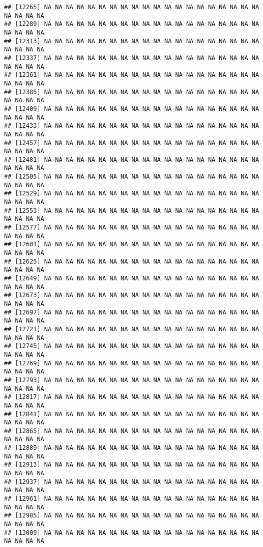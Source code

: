 \documentclass[
]{article}
\begin{document}
\begin{verbatim}
## [12265] NA NA NA NA NA NA NA NA NA NA NA NA NA NA NA NA NA NA NA NA NA NA NA NA
## [12289] NA NA NA NA NA NA NA NA NA NA NA NA NA NA NA NA NA NA NA NA NA NA NA NA
## [12313] NA NA NA NA NA NA NA NA NA NA NA NA NA NA NA NA NA NA NA NA NA NA NA NA
## [12337] NA NA NA NA NA NA NA NA NA NA NA NA NA NA NA NA NA NA NA NA NA NA NA NA
## [12361] NA NA NA NA NA NA NA NA NA NA NA NA NA NA NA NA NA NA NA NA NA NA NA NA
## [12385] NA NA NA NA NA NA NA NA NA NA NA NA NA NA NA NA NA NA NA NA NA NA NA NA
## [12409] NA NA NA NA NA NA NA NA NA NA NA NA NA NA NA NA NA NA NA NA NA NA NA NA
## [12433] NA NA NA NA NA NA NA NA NA NA NA NA NA NA NA NA NA NA NA NA NA NA NA NA
## [12457] NA NA NA NA NA NA NA NA NA NA NA NA NA NA NA NA NA NA NA NA NA NA NA NA
## [12481] NA NA NA NA NA NA NA NA NA NA NA NA NA NA NA NA NA NA NA NA NA NA NA NA
## [12505] NA NA NA NA NA NA NA NA NA NA NA NA NA NA NA NA NA NA NA NA NA NA NA NA
## [12529] NA NA NA NA NA NA NA NA NA NA NA NA NA NA NA NA NA NA NA NA NA NA NA NA
## [12553] NA NA NA NA NA NA NA NA NA NA NA NA NA NA NA NA NA NA NA NA NA NA NA NA
## [12577] NA NA NA NA NA NA NA NA NA NA NA NA NA NA NA NA NA NA NA NA NA NA NA NA
## [12601] NA NA NA NA NA NA NA NA NA NA NA NA NA NA NA NA NA NA NA NA NA NA NA NA
## [12625] NA NA NA NA NA NA NA NA NA NA NA NA NA NA NA NA NA NA NA NA NA NA NA NA
## [12649] NA NA NA NA NA NA NA NA NA NA NA NA NA NA NA NA NA NA NA NA NA NA NA NA
## [12673] NA NA NA NA NA NA NA NA NA NA NA NA NA NA NA NA NA NA NA NA NA NA NA NA
## [12697] NA NA NA NA NA NA NA NA NA NA NA NA NA NA NA NA NA NA NA NA NA NA NA NA
## [12721] NA NA NA NA NA NA NA NA NA NA NA NA NA NA NA NA NA NA NA NA NA NA NA NA
## [12745] NA NA NA NA NA NA NA NA NA NA NA NA NA NA NA NA NA NA NA NA NA NA NA NA
## [12769] NA NA NA NA NA NA NA NA NA NA NA NA NA NA NA NA NA NA NA NA NA NA NA NA
## [12793] NA NA NA NA NA NA NA NA NA NA NA NA NA NA NA NA NA NA NA NA NA NA NA NA
## [12817] NA NA NA NA NA NA NA NA NA NA NA NA NA NA NA NA NA NA NA NA NA NA NA NA
## [12841] NA NA NA NA NA NA NA NA NA NA NA NA NA NA NA NA NA NA NA NA NA NA NA NA
## [12865] NA NA NA NA NA NA NA NA NA NA NA NA NA NA NA NA NA NA NA NA NA NA NA NA
## [12889] NA NA NA NA NA NA NA NA NA NA NA NA NA NA NA NA NA NA NA NA NA NA NA NA
## [12913] NA NA NA NA NA NA NA NA NA NA NA NA NA NA NA NA NA NA NA NA NA NA NA NA
## [12937] NA NA NA NA NA NA NA NA NA NA NA NA NA NA NA NA NA NA NA NA NA NA NA NA
## [12961] NA NA NA NA NA NA NA NA NA NA NA NA NA NA NA NA NA NA NA NA NA NA NA NA
## [12985] NA NA NA NA NA NA NA NA NA NA NA NA NA NA NA NA NA NA NA NA NA NA NA NA
## [13009] NA NA NA NA NA NA NA NA NA NA NA NA NA NA NA NA NA NA NA NA NA NA NA NA

\end{verbatim}
\end{document}
